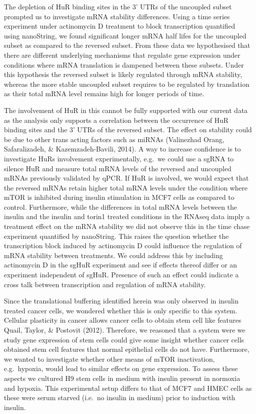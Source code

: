 \documentclass[
  12pt,
  openany]{book}
\begin{document}
The depletion of HuR binding sites in the 3' UTRs of the uncoupled subset prompted us to investigate mRNA stability differences. Using a time series experiment under actinomycin D treatment to block transcription quantified using nanoString, we found significant longer mRNA half lifes for the uncoupled subset as compared to the reversed subset. From these data we hypothesised that there are different underlying mechanisms that regulate gene expression under conditions where mRNA translation is dampened between these subsets. Under this hypothesis the reversed subset is likely regulated through mRNA stability, whereas the more stable uncoupled subset requires to be regulated by translation as their total mRNA level remains high for longer periods of time.

The involvement of HuR in this cannot be fully supported with our current data as the analysis only supports a correlation between the occurrence of HuR binding sites and the 3' UTRs of the reversed subset. The effect on stability could be due to other trans acting factors such as miRNAs (Valinezhad Orang, Safaralizadeh, \& Kazemzadeh-Bavili, 2014). A way to increase confidence is to investigate HuRs involvement experimentally, e.g.~we could use a sgRNA to silence HuR and measure total mRNA levels of the reversed and uncoupled mRNAs previously validated by qPCR. If HuR is involved, we would expect that the reversed mRNAs retain higher total mRNA levels under the condition where mTOR is inhibited during insulin stimulation in MCF7 cells as compared to control. Furthermore, while the differences in total mRNA levels between the insulin and the insulin and torin1 treated conditions in the RNAseq data imply a treatment effect on the mRNA stability we did not observe this in the time chase experiment quantified by nanoString. This raises the question whether the transcription block induced by actinomycin D could influence the regulation of mRNA stability between treatments. We could address this by including actinomycin D in the sgHuR experiment and see if effects thereof differ or an experiment independent of sgHuR. Presence of such an effect could indicate a cross talk between transcription and regulation of mRNA stability.

Since the translational buffering identified herein was only observed in insulin treated cancer cells, we wondered whether this is only specific to this system. Cellular plasticity in cancer allows cancer cells to obtain stem cell like features Quail, Taylor, \& Postovit (2012). Therefore, we reasoned that a system were we study gene expression of stem cells could give some insight whether cancer cells obtained stem cell features that normal epithelial cells do not have. Furthermore, we wanted to investigate whether other means of mTOR inactivation, e.g.~hypoxia, would lead to similar effects on gene expression. To assess these aspects we cultured H9 stem cells in medium with insulin present in normoxia and hypoxia. This experimental setup differs to that of MCF7 and HMEC cells as these were serum starved (i.e.~no insulin in medium) prior to induction with insulin.
\end{document}
